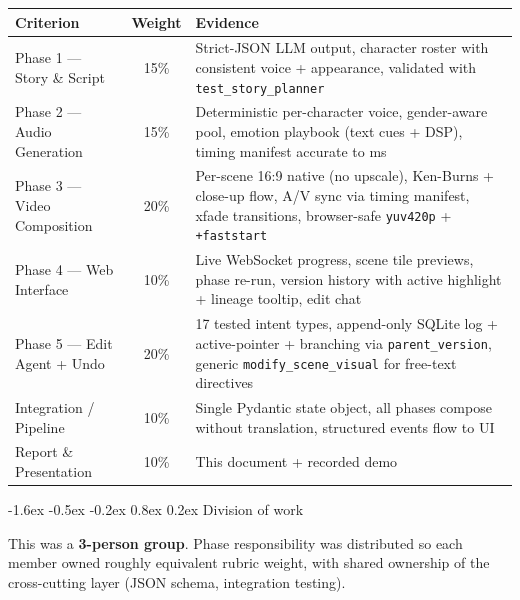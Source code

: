\documentclass[11pt,a4paper]{article}
\makeatletter
\renewcommand\section{\@startsection{section}{1}{\z@}%
   {-1.6ex \@plus -0.5ex \@minus -0.2ex}%
   {0.8ex \@plus 0.2ex}%
   {\Large\bfseries\color{accent}}}
\newcommand{\code}[1]{\texttt{\small #1}}
\makeatother
\begin{document}
\begin{tabularx}{\textwidth}{l c X}
\toprule
\textbf{Criterion} & \textbf{Weight} & \textbf{Evidence} \\
\midrule
Phase 1 --- Story \& Script    & 15\% & Strict-JSON LLM output, character roster with consistent voice + appearance, validated with \code{test\_story\_planner} \\
Phase 2 --- Audio Generation   & 15\% & Deterministic per-character voice, gender-aware pool, emotion playbook (text cues + DSP), timing manifest accurate to ms \\
Phase 3 --- Video Composition  & 20\% & Per-scene 16:9 native (no upscale), Ken-Burns + close-up flow, A/V sync via timing manifest, xfade transitions, browser-safe \code{yuv420p} + \code{+faststart} \\
Phase 4 --- Web Interface      & 10\% & Live WebSocket progress, scene tile previews, phase re-run, version history with active highlight + lineage tooltip, edit chat \\
Phase 5 --- Edit Agent + Undo  & 20\% & 17 tested intent types, append-only SQLite log + active-pointer + branching via \code{parent\_version}, generic \code{modify\_scene\_visual} for free-text directives \\
Integration / Pipeline         & 10\% & Single Pydantic state object, all phases compose without translation, structured events flow to UI \\
Report \& Presentation         & 10\% & This document + recorded demo \\
\bottomrule
\end{tabularx}

\bigskip
\section{Division of work}

This was a \textbf{3-person group}. Phase responsibility was distributed so
each member owned roughly equivalent rubric weight, with shared ownership of
the cross-cutting layer (JSON schema, integration testing).
\end{document}
